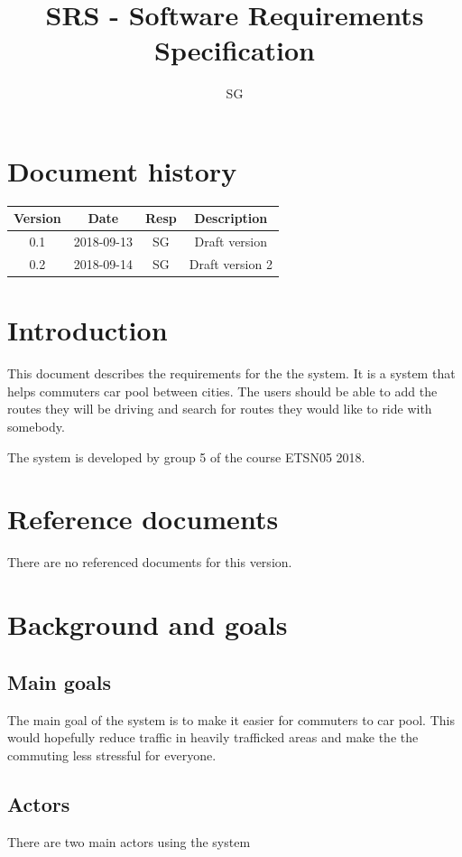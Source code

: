 \documentclass{article}
\title{SRS - Software Requirements Specification}
\begin{document}
\author{SG}

\maketitle
\thispagestyle{fancy}
\tableofcontents
\newpage

\section*{Document history}
 \begin{tabular}{||c c c c||} 
 \hline
 Version & Date & Resp & Description \\ [0.5ex] 
 \hline\hline
 0.1 & 2018-09-13 & SG & Draft version \\ 
 0.2 & 2018-09-14 & SG & Draft version 2 \\
 \hline
 

\end{tabular}

\section{Introduction}
This document describes the requirements for the the system. It is a system that helps commuters car pool between cities. The users should be able to add the routes they will be driving and search for routes they would like to ride with somebody.

The system is developed by group 5 of the course ETSN05 2018.

\section{Reference documents}
There are no referenced documents for this version.
\section{Background and goals}

\subsection{Main goals}
The main goal of the system is to make it easier for commuters to car pool. This would hopefully reduce traffic in heavily trafficked areas and make the the commuting less stressful for everyone.  
\subsection{Actors}
There are two main actors using the system
\end{document}
